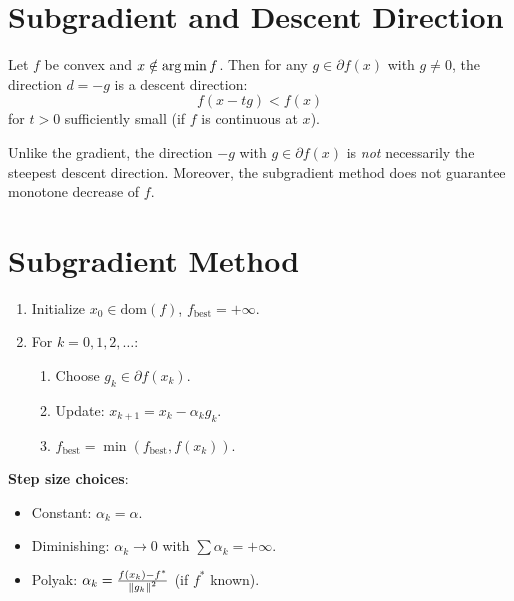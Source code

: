 \section{Subgradient and Descent Direction}

\begin{proposition}
Let $f$ be convex and $x \notin \operatorname*{arg\,min} f$. Then for any $g \in \partial f(x)$ with
$g \neq 0$, the direction $d = -g$ is a descent direction:
\[
    f(x - tg) < f(x)
\]
for $t > 0$ sufficiently small (if $f$ is continuous at $x$).
\end{proposition}

\begin{warning}[title=\textbf{Subgradient vs Gradient}]
Unlike the gradient, the direction $-g$ with $g \in \partial f(x)$ is \emph{not}
necessarily the steepest descent direction. Moreover, the subgradient method does not
guarantee monotone decrease of $f$.
\end{warning}

\section{Subgradient Method}

\begin{algorithme}[title=\textbf{Subgradient Method}]
\begin{enumerate}
    \item Initialize $x_0 \in \mathrm{dom}(f)$, $f_{\mathrm{best}} = +\infty$.
    \item For $k = 0, 1, 2, \ldots$:
    \begin{enumerate}
        \item Choose $g_k \in \partial f(x_k)$.
        \item Update: $x_{k+1} = x_k - \alpha_k g_k$.
        \item $f_{\mathrm{best}} = \min(f_{\mathrm{best}}, f(x_k))$.
    \end{enumerate}
\end{enumerate}
\textbf{Step size choices}:
\begin{itemize}
    \item Constant: $\alpha_k = \alpha$.
    \item Diminishing: $\alpha_k \to 0$ with $\sum \alpha_k = +\infty$.
    \item Polyak: $\alpha_k = \frac{f(x_k) - f^*}{\left\| g_k \right\|^2}$ (if $f^*$ known).
\end{itemize}
\end{algorithme}


